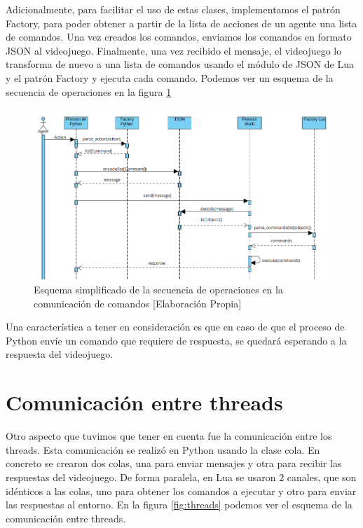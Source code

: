 Adicionalmente, para facilitar el uso de estas clases, implementamos el patrón Factory, para poder obtener a partir de la lista de acciones de un agente una lista de comandos. Una vez creados los comandos, enviamos los comandos en formato JSON al videojuego. Finalmente, una vez recibido el mensaje, el videojuego lo transforma de nuevo a una lista de comandos usando el módulo de JSON de Lua y el patrón Factory y ejecuta cada comando. Podemos ver un esquema de la secuencia de operaciones en la figura \ref {fig:operations}

\begin{figure}[ht]
    \centering
    \includegraphics[width=1.0\textwidth]{img/secuencia_op.png}
    \caption{Esquema simplificado de la secuencia de operaciones en la comunicación de comandos [Elaboración Propia]}
    \label{fig:operations}
\end{figure}

Una característica a tener en consideración es que en caso de que el proceso de Python envíe un comando que requiere de respuesta, se quedará esperando a la respuesta del videojuego.

\section{Comunicación entre threads}

Otro aspecto que tuvimos que tener en cuenta fue la comunicación entre los threads. Esta comunicación se realizó en Python usando la clase cola. En concreto se crearon dos colas, una para enviar mensajes y otra para recibir las respuestas del videojuego. De forma paralela, en Lua se usaron 2 canales, que son idénticos a las colas, uno para obtener los comandos a ejecutar y otro para enviar las respuestas al entorno. En la figura \ref {fig:threads} podemos ver el esquema de la comunicación entre threads. 

